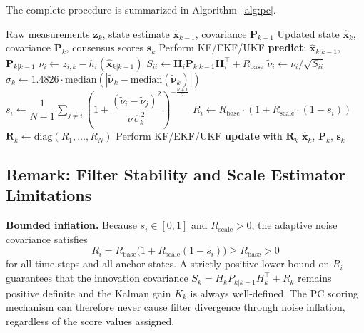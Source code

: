 \documentclass[journal]{IEEEtran}
\newcommand{\mbf}[1]{\mathbf{#1}}
\begin{document}
The complete procedure is summarized in Algorithm~\ref{alg:pc}.

\begin{algorithm}[t]
\caption{Pairwise Consensus Kalman Filtering (PC-KF/EKF/UKF)}
\label{alg:pc}
\begin{algorithmic}[1]
\REQUIRE Raw measurements $\mbf{z}_k$, state estimate $\hat{\mbf{x}}_{k-1}$, covariance $\mbf{P}_{k-1}$
\ENSURE Updated state $\hat{\mbf{x}}_k$, covariance $\mbf{P}_k$, consensus scores $\mbf{s}_k$
\STATE Perform KF/EKF/UKF \textbf{predict}: $\hat{\mbf{x}}_{k|k-1}$, $\mbf{P}_{k|k-1}$
    \STATE $\nu_i \leftarrow z_{i,k} - h_i(\hat{\mbf{x}}_{k|k-1})$ \hfill {}
    \STATE $S_{ii} \leftarrow \mbf{H}_i\mbf{P}_{k|k-1}\mbf{H}_i^\top + R_{\text{base}}$ \hfill {}
    \STATE $\tilde{\nu}_i \leftarrow \nu_i / \sqrt{S_{ii}}$ \hfill {}
\ENDFOR
\STATE $\widehat{\sigma}_k \leftarrow 1.4826 \cdot \mathrm{median}(|\tilde{\boldsymbol{\nu}}_k - \mathrm{median}(\tilde{\boldsymbol{\nu}}_k)|)$ \hfill {}
    \STATE $s_i \leftarrow \dfrac{1}{N-1}\displaystyle\sum_{j \neq i} \left(1 + \dfrac{(\tilde{\nu}_i-\tilde{\nu}_j)^2}{\nu\,\widehat{\sigma}_k^{\,2}}\right)^{-\frac{\nu+1}{2}}$ \hfill {}
    \STATE $R_i \leftarrow R_{\text{base}} \cdot (1 + R_{\text{scale}} \cdot (1-s_i))$ \hfill {}
\ENDFOR
\STATE $\mbf{R}_k \leftarrow \mathrm{diag}(R_1, \ldots, R_N)$
\STATE Perform KF/EKF/UKF \textbf{update} with $\mbf{R}_k$
\RETURN $\hat{\mbf{x}}_k$, $\mbf{P}_k$, $\mbf{s}_k$
\end{algorithmic}
\end{algorithm}

\subsection*{Remark: Filter Stability and Scale Estimator Limitations}

\textbf{Bounded inflation.}
Because $s_i \in [0,1]$ and $R_{\text{scale}} > 0$, the adaptive noise covariance satisfies
\begin{equation}
    R_i = R_{\text{base}}\bigl(1 + R_{\text{scale}}(1-s_i)\bigr) \geq R_{\text{base}} > 0
\end{equation}
for all time steps and all anchor states. A strictly positive lower bound on $R_i$ guarantees that the innovation covariance $S_k = H_k P_{k|k-1} H_k^\top + R_k$ remains positive definite and the Kalman gain $K_k$ is always well-defined. The PC scoring mechanism can therefore never cause filter divergence through noise inflation, regardless of the score values assigned.
\end{document}
